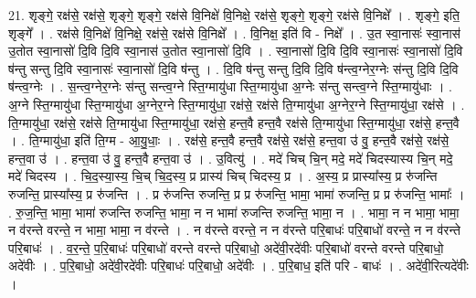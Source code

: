 \documentclass[17pt]{extarticle}
\begin{document}
21. शृङ्गे॒ रक्ष॑से॒ रक्ष॑से॒ शृङ्गे॒ शृङ्गे॒ रक्ष॑से वि॒निक्षे॑ वि॒निक्षे॒ रक्ष॑से॒ शृङ्गे॒ शृङ्गे॒ रक्ष॑से वि॒निक्षे᳚ । . शृङ्गे॒ इति॒ शृङ्गे᳚ । . रक्ष॑से वि॒निक्षे॑ वि॒निक्षे॒ रक्ष॑से॒ रक्ष॑से वि॒निक्षे᳚ । . वि॒निक्ष॒ इति॑ वि - निक्षे᳚ । . उ॒त स्वा॒नासः॑ स्वा॒नास॑ उ॒तोत स्वा॒नासो॑ दि॒वि दि॒वि स्वा॒नास॑ उ॒तोत स्वा॒नासो॑ दि॒वि । . स्वा॒नासो॑ दि॒वि दि॒वि स्वा॒नासः॑ स्वा॒नासो॑ दि॒वि ष॑न्तु सन्तु दि॒वि स्वा॒नासः॑ स्वा॒नासो॑ दि॒वि ष॑न्तु । . दि॒वि ष॑न्तु सन्तु दि॒वि दि॒वि ष॑न्त्व॒ग्नेर॒ग्नेः स॑न्तु दि॒वि दि॒वि ष॑न्त्व॒ग्नेः । . स॒न्त्व॒ग्नेर॒ग्नेः स॑न्तु सन्त्व॒ग्ने स्ति॒ग्मायु॑धा स्ति॒ग्मायु॑धा अ॒ग्नेः स॑न्तु सन्त्व॒ग्ने स्ति॒ग्मायु॑धाः । . अ॒ग्ने स्ति॒ग्मायु॑धा स्ति॒ग्मायु॑धा अ॒ग्नेर॒ग्ने स्ति॒ग्मायु॑धा॒ रक्ष॑से॒ रक्ष॑से ति॒ग्मायु॑धा अ॒ग्नेर॒ग्ने स्ति॒ग्मायु॑धा॒ रक्ष॑से । . ति॒ग्मायु॑धा॒ रक्ष॑से॒ रक्ष॑से ति॒ग्मायु॑धा स्ति॒ग्मायु॑धा॒ रक्ष॑से॒ हन्त॒वै हन्त॒वै रक्ष॑से ति॒ग्मायु॑धा स्ति॒ग्मायु॑धा॒ रक्ष॑से॒ हन्त॒वै । . ति॒ग्मायु॑धा॒ इति॑ ति॒ग्म - आ॒यु॒धाः॒ । . रक्ष॑से॒ हन्त॒वै हन्त॒वै रक्ष॑से॒ रक्ष॑से॒ हन्त॒वा उ॑ वु॒ हन्त॒वै रक्ष॑से॒ रक्ष॑से॒ हन्त॒वा उ॑ । . हन्त॒वा उ॑ वु॒ हन्त॒वै हन्त॒वा उ॑ । . उ॒वित्यु॑ । . मदे॑ चिच् चि॒न् मदे॒ मदे॑ चिदस्यास्य चि॒न् मदे॒ मदे॑ चिदस्य । . चि॒द॒स्या॒स्य॒ चि॒च् चि॒द॒स्य॒ प्र प्रास्य॑ चिच् चिदस्य॒ प्र । . अ॒स्य॒ प्र प्रास्या᳚स्य॒ प्र रु॑जन्ति रुजन्ति॒ प्रास्या᳚स्य॒ प्र रु॑जन्ति । . प्र रु॑जन्ति रुजन्ति॒ प्र प्र रु॑जन्ति॒ भामा॒ भामा॑ रुजन्ति॒ प्र प्र रु॑जन्ति॒ भामाः᳚ । . रु॒ज॒न्ति॒ भामा॒ भामा॑ रुजन्ति रुजन्ति॒ भामा॒ न न भामा॑ रुजन्ति रुजन्ति॒ भामा॒ न । . भामा॒ न न भामा॒ भामा॒ न व॑रन्ते वरन्ते॒ न भामा॒ भामा॒ न व॑रन्ते । . न व॑रन्ते वरन्ते॒ न न व॑रन्ते परि॒बाधः॑ परि॒बाधो॑ वरन्ते॒ न न व॑रन्ते परि॒बाधः॑ । . व॒र॒न्ते॒ प॒रि॒बाधः॑ परि॒बाधो॑ वरन्ते वरन्ते परि॒बाधो॒ अदे॑वी॒रदे॑वीः परि॒बाधो॑ वरन्ते वरन्ते परि॒बाधो॒ अदे॑वीः । . प॒रि॒बाधो॒ अदे॑वी॒रदे॑वीः परि॒बाधः॑ परि॒बाधो॒ अदे॑वीः । . प॒रि॒बाध॒ इति॑ परि - बाधः॑ । . अदे॑वी॒रित्यदे॑वीः । \newline
\pagebreak
\end{document}
